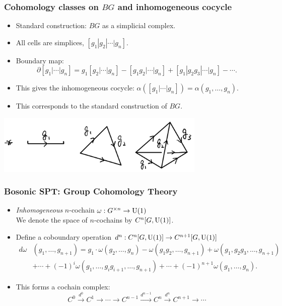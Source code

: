 \documentclass[xcolor=table, aspectratio=169,ignorenonframetext]{beamer}
\newcommand{\uone}{\text U(1)}
\begin{document}
\begin{frame}
	\frametitle{Cohomology classes on $BG$ and inhomogeneous cocycle}
	\begin{itemize}
		\item Standard construction: $BG$ as a simplicial complex.
		\item All cells are simplices, $[g_1|g_2|\cdots|g_n]$.
		\item Boundary map:
		\[\partial[g_1|\cdots|g_n]=g_1[g_2|\cdots|g_n]
		-[g_1g_2|\cdots|g_n]+[g_1|g_2g_3|\cdots|g_n]-\cdots.\]
		\item This gives the inhomogeneous cocycle:
		$\alpha([g_1|\cdots|g_n])=\alpha(g_1,\ldots,g_n)$.
		\item This corresponds to the standard construction of $BG$.
	\end{itemize}
\begin{center}
	\includegraphics[width=10cm]{../chainmap/bg-std}
\end{center}
\end{frame}

\begin{frame}
\frametitle{Bosonic SPT: Group Cohomology Theory}
\begin{itemize}
	\item \emph{Inhomogeneous} $n$-cochain $\omega: G^{\times n}\rightarrow \uone$\\
	We denote the space of $n$-cochains by $C^n[G,\uone]$.
	\item Define a coboundary operation $d^n:C^n[G,\uone]\rightarrow C^{n+1}[G,\uone]$
	\begin{align*}
		d\omega &(g_1,\ldots,g_{n+1})=g_1\cdot \omega(g_2,\ldots,g_n)
		-\omega(g_1g_2,\ldots,g_{n+1})
		+\omega(g_1,g_2g_3,\ldots,g_{n+1})\\
		&+\cdots+(-1)^i\omega(g_1,\ldots,g_ig_{i+1},\ldots,g_{n+1})
		+\cdots + (-1)^{n+1}\omega(g_1,\ldots,g_n).
	\end{align*}
	\item This forms a cochain complex:
	\[C^0\xrightarrow{d^0}C^1\rightarrow\cdots\rightarrow C^{n-1}\xrightarrow{d^{n-1}}C^n\xrightarrow{d^n}C^{n+1}\rightarrow\cdots\]
\end{itemize}
\end{frame}
\end{document}
